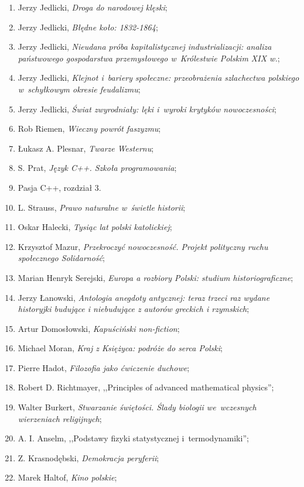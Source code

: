 \documentclass[a4paper,11pt]{article}
\begin{document}
\begin{enumerate}
{    studia z dziejów idei i~wyobraźni XIX wieku};
\item Jerzy Jedlicki, \emph{Droga do narodowej klęski};
\item Jerzy Jedlicki, \emph{Błędne koło: 1832-1864};
\item Jerzy Jedlicki, \emph{Nieudana próba kapitalistycznej
    industrializacji: analiza państwowego gospodarstwa przemysłowego
    w~Królestwie Polskim XIX w.};
\item Jerzy Jedlicki, \emph{Klejnot i~bariery społeczne: przeobrażenia
    szlachectwa polskiego w~schyłkowym okresie feudalizmu};
\item Jerzy Jedlicki, \emph{Świat zwyrodniały: lęki i~wyroki krytyków
    nowoczesności};
\item Rob Riemen, \emph{Wieczny powrót faszyzmu};
\item Łukasz A. Plesnar, \emph{Twarze Westernu};
\item S. Prat, \emph{Język C++. Szkoła programowania};
\item Pasja C++, rozdział 3.
\item L. Strauss, \emph{Prawo naturalne w~świetle historii};
\item Oskar Halecki, \emph{Tysiąc lat polski katolickiej};
\item Krzysztof Mazur, \emph{Przekroczyć nowoczesność. Projekt
    polityczny ruchu społecznego Solidarność};
\item Marian Henryk Serejski, \emph{Europa a rozbiory Polski: studium
    historiograficzne};
\item Jerzy Łanowski, \emph{Antologia anegdoty antycznej: teraz trzeci
    raz wydane historyjki budujące i niebudujące z autorów greckich i
    rzymskich};
\item Artur Domosłowski, \emph{Kapuściński non-fiction};
\item Michael Moran, \emph{Kraj z Księżyca: podróże do serca Polski};
\item Pierre Hadot, \emph{Filozofia jako ćwiczenie duchowe};
\item Robert D. Richtmayer, ,,Principles of advanced mathematical
  physics'';
\item Walter Burkert, \emph{Stwarzanie świętości. Ślady biologii
    we~wczesnych wierzeniach religijnych};
\item A. I. Anselm, ,,Podstawy fizyki statystycznej i~termodynamiki'';
\item Z. Krasnodębski, \emph{Demokracja peryferii};
\item Marek Haltof, \emph{Kino polskie};

\end{enumerate}
\end{document}

